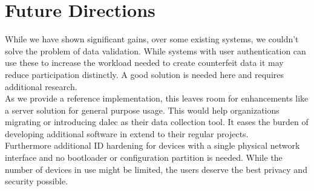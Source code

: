 \section{Future Directions}

    While we have shown significant gains, over some existing systems, we couldn't solve the problem of data validation. While systems with user authentication can use these to increase the workload needed to create counterfeit data it may reduce participation distinctly. A good solution is needed here and requires additional research.\\
    As we provide a reference implementation, this leaves room for enhancements like a server solution for general purpose usage. This would help organizations migrating or introducing dalec as their data collection tool. It eases the burden of developing additional software in extend to their regular projects.\\
    Furthermore additional ID hardening for devices with a single physical network interface and no bootloader or configuration partition is needed. While the number of devices in use might be limited, the users deserve the best privacy and security possible.
    

